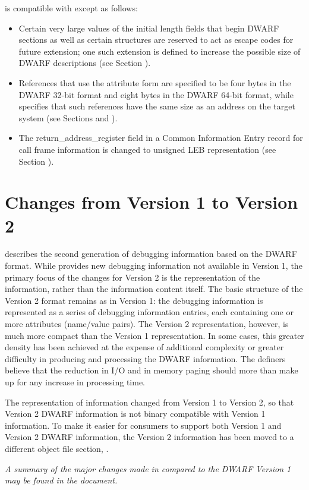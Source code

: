 is compatible with
 except as follows:
\begin{itemize}
\item
Certain very large values of the initial length fields that
begin DWARF sections as well as certain structures are reserved
to act as escape codes for future extension; one such extension
is defined to increase the possible size of DWARF descriptions
(see Section ).
\item
References that use the attribute form
\DWFORMrefaddrNAME{}
are specified to be four bytes in the DWARF 32-bit format and
eight bytes in the DWARF 64-bit format, while
specifies that such references have the same size as an
address on the target system (see Sections
 and
).
\item
The return\_address\_register field in a Common Information
Entry record for call frame information is changed to unsigned
LEB representation (see Section
).
\end{itemize}

\section{Changes from Version 1 to Version 2}
describes the second generation of debugging
information based on the DWARF format. While
provides new debugging information not available in
Version 1, the primary focus of the changes for Version
2 is the representation of the information, rather than
the information content itself. The basic structure of
the Version 2 format remains as in Version 1: the debugging
information is represented as a series of debugging information
entries, each containing one or more attributes (name/value
pairs). The Version 2 representation, however, is much more
compact than the Version 1 representation. In some cases,
this greater density has been achieved at the expense of
additional complexity or greater difficulty in producing and
processing the DWARF information. The definers believe that the
reduction in I/O and in memory paging should more than make
up for any increase in processing time.

The representation
of information changed from Version 1 to Version 2, so that
Version 2 DWARF information is not binary compatible with
Version 1 information. To make it easier for consumers to
support both Version 1 and Version 2 DWARF information, the
Version 2 information has been moved to a different object
file section, \dotdebuginfo{}.

\textit{
A summary of the major changes made in
compared to the DWARF Version 1 may be found in the
document.
}
